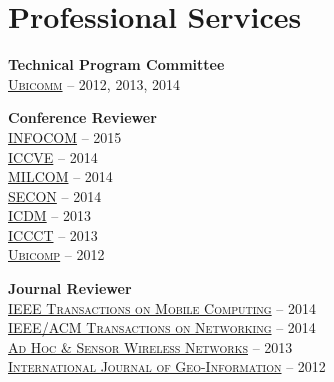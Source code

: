 \section{\sc Professional Services}
{\bf Technical Program Committee}\\
{\href{http://www.iaria.org/conferences.html}{\textsc{Ubicomm}}} -- 2012, 2013, 2014

{\bf Conference Reviewer}\\
{\href{http://infocom2015.ieee-infocom.org/}{\textsc{INFOCOM}}} -- 2015\\
{\href{http://www.iccve.org/2014/}{\textsc{ICCVE}}} -- 2014\\
{\href{http://www.milcom.org/2014/}{\textsc{MILCOM}}} -- 2014\\
{\href{http://secon2014.ieee-secon.org}{\textsc{SECON}}} -- 2014\\
{\href{http://icdm2013.rutgers.edu}{\textsc{ICDM}}} -- 2013\\
{\href{http://www.mnnit.ac.in/iccct2013}{\textsc{ICCCT}}} -- 2013\\
{\href{http://www.ubicomp.org/ubicomp2012}{\textsc{Ubicomp}}} -- 2012

{\bf Journal Reviewer}\\
{\href{http://www.computer.org/portal/web/tmc}{\textsc{IEEE Transactions on Mobile Computing}}} -- 2014\\
{\href{http://www.ifp.illinois.edu/ton}{\textsc{IEEE/ACM Transactions on Networking}}} -- 2014\\
{\href{http://www.oldcitypublishing.com/AHSWN/AHSWN.html}{\textsc{Ad Hoc \& Sensor Wireless Networks}}} -- 2013\\
{\href{http://www.mdpi.com/journal/ijgi}{\textsc{International Journal of Geo-Information}}} -- 2012
